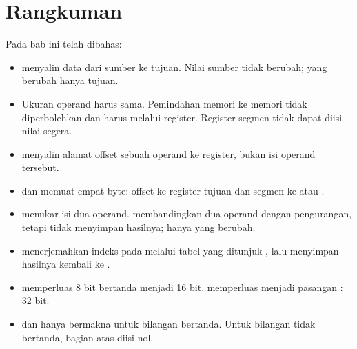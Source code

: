 \section{Rangkuman}
\label{sec:rangkuman-bab8}

Pada bab ini telah dibahas:

\begin{itemize}
    \item {} menyalin data dari sumber ke tujuan. Nilai
          sumber tidak berubah; yang berubah hanya tujuan.

    \item Ukuran operand  harus sama. Pemindahan memori ke
          memori tidak diperbolehkan dan harus melalui register.
          Register segmen tidak dapat diisi nilai segera.

    \item {} menyalin alamat offset sebuah operand ke
          register, bukan isi operand tersebut.

    \item {} dan  memuat  empat
          byte: offset ke register tujuan dan segmen ke 
          atau .

    \item {} menukar isi dua operand. 
          membandingkan dua operand dengan pengurangan, tetapi tidak
          menyimpan hasilnya; hanya  yang berubah.

    \item {} menerjemahkan indeks pada  melalui
          tabel yang ditunjuk , lalu menyimpan hasilnya
          kembali ke .

    \item {} memperluas  8 bit bertanda menjadi
           16 bit.  memperluas  menjadi
          pasangan : 32 bit.

    \item {} dan  hanya bermakna untuk bilangan
          bertanda. Untuk bilangan tidak bertanda, bagian atas
          diisi nol.
\end{itemize}

